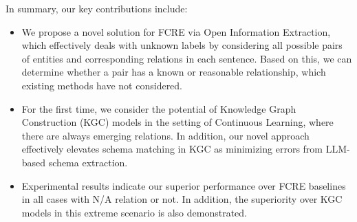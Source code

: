 In summary, our key contributions include:
\begin{itemize}
\item We propose a novel solution for FCRE via Open Information Extraction, which 
effectively deals with unknown labels by considering all possible pairs of entities and corresponding relations in each sentence.
Based on this, we can determine whether a pair has a known or reasonable relationship, which existing methods have not considered.



\item For the first time, we consider the potential of Knowledge Graph Construction (KGC) models in the setting of Continuous Learning, where there are always emerging relations. In addition, our novel approach effectively elevates schema matching in KGC as minimizing errors from LLM-based schema extraction.

\item Experimental results indicate our superior performance over FCRE baselines in all cases with N/A relation or not. In addition, the superiority over KGC models in this extreme scenario is also demonstrated.






\end{itemize}
